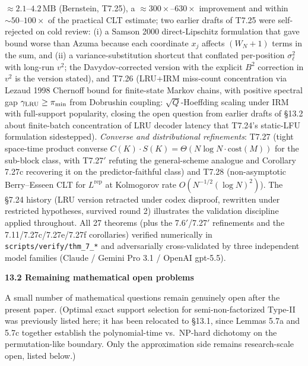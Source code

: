 \documentclass[
]{article}
\begin{document}
\begin{itemize}
  $\approx 2.1$--$4.2\,\mathrm{MB}$ (Bernstein, T7.25), a
  $\approx 300\times$--$630\times$ improvement and within
  $\sim 50$--$100\times$ of the practical CLT estimate; two earlier drafts of T7.25 were
  self-rejected on cold review: (i) a Samson 2000 direct-Lipschitz
  formulation that gave bound worse than Azuma because each
  coordinate $x_j$ affects $(W_N+1)$ terms in the sum, and (ii) a
  variance-substitution shortcut that conflated per-position
  $\sigma_\ell^2$ with long-run $v^2$; the Davydov-corrected version
  with the explicit $B^2$ correction in $v^2$ is the version stated),
  and T7.26 (LRU+IRM miss-count concentration via Lezaud 1998
  Chernoff bound for finite-state Markov chains, with positive
  spectral gap $\gamma_{\rm LRU} \geq \pi_{\rm min}$ from Dobrushin
  coupling: $\sqrt{Q}$-Hoeffding scaling under IRM with full-support
  popularity, closing the open question from earlier drafts of §13.2
  about finite-batch concentration of LRU decoder latency that
  T7.24's static-LFU formulation sidestepped). \emph{Converse and
  distributional refinements}: T7.27 (tight space-time product
  converse $C(K)\cdot S(K)=\Theta(N\log N\cdot\mathrm{cost}(M))$ for
  the sub-block class, with T7.27$'$ refuting the general-scheme
  analogue and Corollary 7.27c recovering it on the predictor-faithful
  class) and T7.28 (non-asymptotic Berry--Esseen CLT for
  $L^{\mathrm{rep}}$ at Kolmogorov rate $O(N^{-1/2}(\log N)^2)$).
  The §7.24 history
  (LRU version retracted under codex disproof, rewritten under
  restricted hypotheses, survived round 2) illustrates the
  validation discipline applied throughout.
  All 27 theorems (plus the 7.6$'$/7.27$'$ refinements and the
  7.11/7.27c/7.27e/7.27f corollaries) verified numerically in
  \texttt{scripts/verify/thm\_7\_*} and adversarially
  cross-validated by three independent model families
  (Claude / Gemini Pro 3.1 / OpenAI gpt-5.5).
\end{itemize}

\textbf{13.2 Remaining mathematical open problems}

A small number of mathematical questions remain genuinely open after
the present paper. (Optimal exact support selection for
semi-non-factorized Type-II was previously listed here; it has been
relocated to §13.1, since Lemmas 5.7a and 5.7c together establish
the polynomial-time vs.\ NP-hard dichotomy on the permutation-like
boundary. Only the approximation side remains research-scale open,
listed below.)
\end{document}
